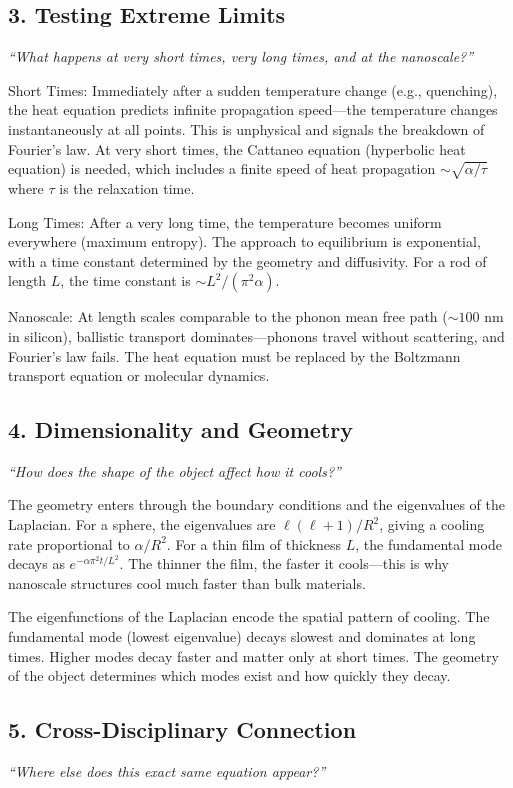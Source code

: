 \documentclass[11pt,openright]{book}
\begin{document}
\subsection*{3. Testing Extreme Limits}
\textit{``What happens at very short times, very long times, and at the nanoscale?''}

Short Times: Immediately after a sudden temperature change (e.g., quenching), the heat equation predicts infinite propagation speed---the temperature changes instantaneously at all points. This is unphysical and signals the breakdown of Fourier's law. At very short times, the Cattaneo equation (hyperbolic heat equation) is needed, which includes a finite speed of heat propagation $\sim \sqrt{\alpha/\tau}$ where $\tau$ is the relaxation time.

Long Times: After a very long time, the temperature becomes uniform everywhere (maximum entropy). The approach to equilibrium is exponential, with a time constant determined by the geometry and diffusivity. For a rod of length $L$, the time constant is $\sim L^2/(\pi^2\alpha)$.

Nanoscale: At length scales comparable to the phonon mean free path ($\sim 100$ nm in silicon), ballistic transport dominates---phonons travel without scattering, and Fourier's law fails. The heat equation must be replaced by the Boltzmann transport equation or molecular dynamics.

\subsection*{4. Dimensionality and Geometry}
\textit{``How does the shape of the object affect how it cools?''}

The geometry enters through the boundary conditions and the eigenvalues of the Laplacian. For a sphere, the eigenvalues are $\ell(\ell+1)/R^2$, giving a cooling rate proportional to $\alpha/R^2$. For a thin film of thickness $L$, the fundamental mode decays as $e^{-\alpha\pi^2 t/L^2}$. The thinner the film, the faster it cools---this is why nanoscale structures cool much faster than bulk materials.

The eigenfunctions of the Laplacian encode the spatial pattern of cooling. The fundamental mode (lowest eigenvalue) decays slowest and dominates at long times. Higher modes decay faster and matter only at short times. The geometry of the object determines which modes exist and how quickly they decay.

\subsection*{5. Cross-Disciplinary Connection}
\textit{``Where else does this exact same equation appear?''}
\end{document}
